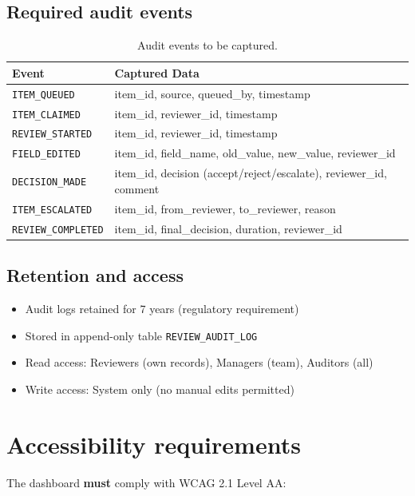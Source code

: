 \subsection{Required audit events}

\begin{table}[htbp]
\centering
\caption{Audit events to be captured.}
\label{tab:audit-events}
\footnotesize
\begin{tabularx}{\linewidth}{@{}l X@{}}
\toprule
\textbf{Event} & \textbf{Captured Data} \\ \midrule
\texttt{ITEM\_QUEUED} & item\_id, source, queued\_by, timestamp \\
\texttt{ITEM\_CLAIMED} & item\_id, reviewer\_id, timestamp \\
\texttt{REVIEW\_STARTED} & item\_id, reviewer\_id, timestamp \\
\texttt{FIELD\_EDITED} & item\_id, field\_name, old\_value, new\_value, reviewer\_id \\
\texttt{DECISION\_MADE} & item\_id, decision (accept/reject/escalate), reviewer\_id, comment \\
\texttt{ITEM\_ESCALATED} & item\_id, from\_reviewer, to\_reviewer, reason \\
\texttt{REVIEW\_COMPLETED} & item\_id, final\_decision, duration, reviewer\_id \\
\bottomrule
\end{tabularx}
\end{table}

\subsection{Retention and access}

\begin{itemize}
  \item Audit logs retained for 7 years (regulatory requirement)
  \item Stored in append-only table \texttt{REVIEW\_AUDIT\_LOG}
  \item Read access: Reviewers (own records), Managers (team), Auditors (all)
  \item Write access: System only (no manual edits permitted)
\end{itemize}

\section{Accessibility requirements}

The dashboard \textbf{must} comply with WCAG 2.1 Level AA:


